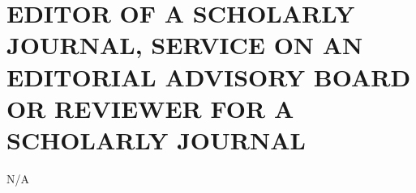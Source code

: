 \section{EDITOR OF A SCHOLARLY JOURNAL, SERVICE ON AN EDITORIAL
  ADVISORY BOARD OR REVIEWER FOR A SCHOLARLY JOURNAL} N/A